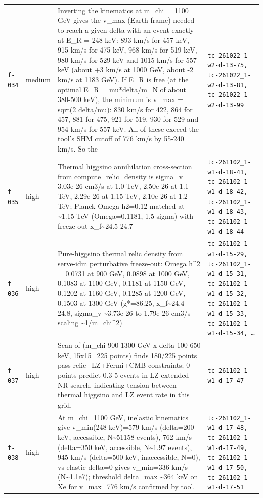 \documentclass[11pt,a4paper]{article}
\begin{document}
\begin{longtable}{@{}p{}p{}p{}p{}@{}}
\texttt{f-034} & medium & Inverting the kinematics at m\_chi = 1100 GeV gives the v\_max (Earth frame) needed to reach a given delta with an event exactly at E\_R = 248 keV: 893 km/s for 457 keV, 915 km/s for 475 keV, 968 km/s for 519 keV, 980 km/s for 529 keV and 1015 km/s for 557 keV (about +3 km/s at 1000 GeV, about -2 km/s at 1183 GeV). If E\_R is free (at the optimal E\_R = mu*delta/m\_N of about 380-500 keV), the minimum is v\_max = sqrt(2 delta/mu): 830 km/s for 422, 864 for 457, 881 for 475, 921 for 519, 930 for 529 and 954 km/s for 557 keV. All of these exceed the tool's SHM cutoff of 776 km/s by 55-240 km/s. So the  & \texttt{tc-261022\_\allowbreak{}1-w2-d-13-75,\allowbreak{} tc-261022\_\allowbreak{}1-w2-d-13-81,\allowbreak{} tc-261022\_\allowbreak{}1-w2-d-13-99} \\
\texttt{f-035} & high & Thermal higgsino annihilation cross-section from compute\_relic\_density is sigma\_v = 3.03e-26 cm3/s at 1.0 TeV, 2.50e-26 at 1.1 TeV, 2.29e-26 at 1.15 TeV, 2.10e-26 at 1.2 TeV; Planck Omega h2=0.12 matched at \textasciitilde{}1.15 TeV (Omega=0.1181, 1.5 sigma) with freeze-out x\_f\textasciitilde{}24.5-24.7 & \texttt{tc-261102\_\allowbreak{}1-w1-d-18-41,\allowbreak{} tc-261102\_\allowbreak{}1-w1-d-18-42,\allowbreak{} tc-261102\_\allowbreak{}1-w1-d-18-43,\allowbreak{} tc-261102\_\allowbreak{}1-w1-d-18-44} \\
\texttt{f-036} & high & Pure-higgsino thermal relic density from serve-idm perturbative freeze-out: Omega h\textasciicircum{}2 = 0.0731 at 900 GeV, 0.0898 at 1000 GeV, 0.1083 at 1100 GeV, 0.1181 at 1150 GeV, 0.1202 at 1160 GeV, 0.1285 at 1200 GeV, 0.1503 at 1300 GeV (g*=86.25, x\_f\textasciitilde{}24.4-24.8, sigma\_v \textasciitilde{}3.73e-26 to 1.79e-26 cm3/s scaling \textasciitilde{}1/m\_chi\textasciicircum{}2) & \texttt{tc-261102\_\allowbreak{}1-w1-d-15-29,\allowbreak{} tc-261102\_\allowbreak{}1-w1-d-15-31,\allowbreak{} tc-261102\_\allowbreak{}1-w1-d-15-32,\allowbreak{} tc-261102\_\allowbreak{}1-w1-d-15-33,\allowbreak{} tc-261102\_\allowbreak{}1-w1-d-15-34,\allowbreak{} \ldots{}\allowbreak{}} \\
\texttt{f-037} & high & Scan of (m\_chi 900-1300 GeV x delta 100-650 keV, 15x15=225 points) finds 180/225 points pass relic+LZ+Fermi+CMB constraints; 0 points predict 0.3-5 events in LZ extended NR search, indicating tension between thermal higgsino and LZ event rate in this grid. & \texttt{tc-261102\_\allowbreak{}1-w1-d-17-47} \\
\texttt{f-038} & high & At m\_chi=1100 GeV, inelastic kinematics give v\_min(248 keV)=579 km/s (delta=200 keV, accessible, N\textasciitilde{}51158 events), 762 km/s (delta=350 keV, accessible, N\textasciitilde{}1.97 events), 945 km/s (delta=500 keV, inaccessible, N=0), vs elastic delta=0 gives v\_min=336 km/s (N\textasciitilde{}1.1e7); threshold delta\_max \textasciitilde{}364 keV on Xe for v\_max=776 km/s confirmed by tool. & \texttt{tc-261102\_\allowbreak{}1-w1-d-17-48,\allowbreak{} tc-261102\_\allowbreak{}1-w1-d-17-49,\allowbreak{} tc-261102\_\allowbreak{}1-w1-d-17-50,\allowbreak{} tc-261102\_\allowbreak{}1-w1-d-17-51} \\

\end{longtable}
\end{document}
